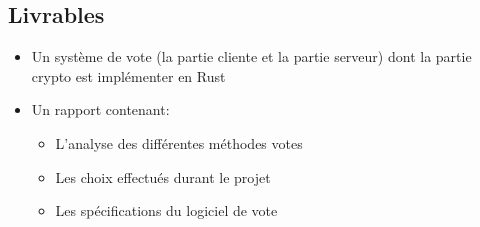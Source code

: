 \documentclass[../report]{subfiles}
\begin{document}
\subsection{Livrables}
    \begin{itemize}
      \item Un système de vote (la partie cliente et la partie serveur) dont la partie crypto est implémenter en Rust
      \item Un rapport contenant: 
      \begin{itemize}
        \item L'analyse des différentes méthodes votes
        \item Les choix effectués durant le projet
        \item Les spécifications du logiciel de vote
      \end{itemize}
    \end{itemize}
\end{document}
